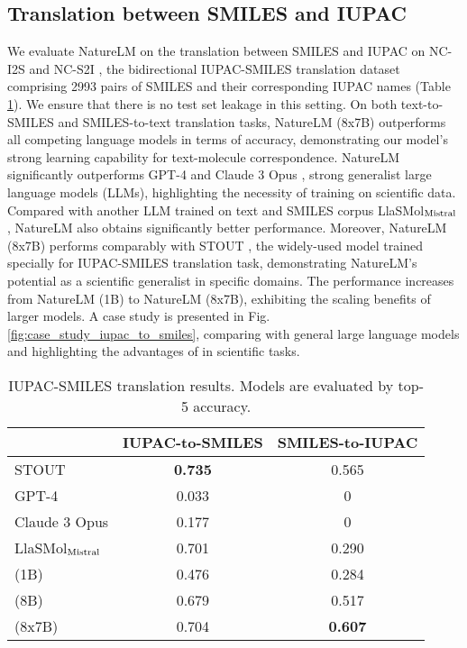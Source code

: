 \subsection{Translation between SMILES and IUPAC}\label{sec:smiles_iupac}
We evaluate NatureLM on the translation between SMILES and IUPAC on NC-I2S and NC-S2I \cite{yu2024llasmol}, the bidirectional IUPAC-SMILES translation dataset comprising 2993 pairs of SMILES and their corresponding IUPAC names (Table \ref{tab:text_to_cmpd_eval}). We ensure that there is no test set leakage in this setting. On both text-to-SMILES and SMILES-to-text translation tasks, NatureLM (8x7B) outperforms all competing language models in terms of accuracy, demonstrating our model's strong learning capability for text-molecule correspondence. NatureLM significantly outperforms GPT-4 and Claude 3 Opus \cite{claude3}, strong generalist large language models (LLMs), highlighting the necessity of training on scientific data. Compared with another LLM trained on text and SMILES corpus LlaSMol$_{\rm Mistral}$ \cite{yu2024llasmol}, NatureLM also obtains significantly better performance. Moreover, NatureLM (8x7B) performs comparably with STOUT \cite{rajan2024stout},  the widely-used model trained specially for IUPAC-SMILES translation task, demonstrating NatureLM's potential as a scientific generalist in specific domains. The performance increases from NatureLM (1B) to NatureLM (8x7B), exhibiting the scaling benefits of larger models. A case study is presented in Fig. \ref{fig:case_study_iupac_to_smiles}, comparing \ourM{} with general large language models and highlighting the advantages of \ourM{} in scientific tasks.

\begin{table}[!htbp]
\centering
\begin{tabular}{lcc}
\toprule
& IUPAC-to-SMILES & SMILES-to-IUPAC\\
\midrule
STOUT &\textbf{0.735}&0.565\\ 
GPT-4&0.033&0\\ 
Claude 3 Opus & 0.177 & 0\\
LlaSMol$_{\rm Mistral}$ & 0.701 & 0.290\\
\ourM{} (1B) & 0.476 & 0.284\\
\ourM{} (8B) & 0.679 & 0.517\\
\ourM{} (8x7B) & 0.704 & \textbf{0.607}\\
\bottomrule
\end{tabular}
\caption{IUPAC-SMILES translation results. Models are evaluated by top-5 accuracy.}
\label{tab:text_to_cmpd_eval}
\end{table}

